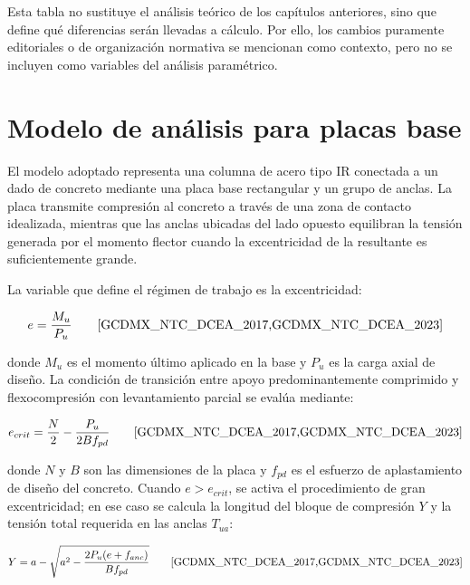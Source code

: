 Esta tabla no sustituye el análisis teórico de los capítulos anteriores, sino que define qué
diferencias serán llevadas a cálculo. Por ello, los cambios puramente editoriales o de
organización normativa se mencionan como contexto, pero no se incluyen como variables del análisis
paramétrico.

\section{Modelo de análisis para placas base}

El modelo adoptado representa una columna de acero tipo IR conectada a un dado de concreto mediante
una placa base rectangular y un grupo de anclas. La placa transmite compresión al concreto a través
de una zona de contacto idealizada, mientras que las anclas ubicadas del lado opuesto equilibran la
tensión generada por el momento flector cuando la excentricidad de la resultante es suficientemente
grande.

La variable que define el régimen de trabajo es la excentricidad:

\begin{equation}
  e = \frac{M_u}{P_u}
  \qquad \text{\cite{GCDMX_NTC_DCEA_2017,GCDMX_NTC_DCEA_2023}}
  \label{eq:met_e}
\end{equation}

\noindent donde $M_u$ es el momento último aplicado en la base y $P_u$ es la carga axial de diseño.
La condición de transición entre apoyo predominantemente comprimido y flexocompresión con
levantamiento parcial se evalúa mediante:

\begin{equation}
  e_{crit} = \frac{N}{2} - \frac{P_u}{2Bf_{pd}}
  \qquad \text{\cite{GCDMX_NTC_DCEA_2017,GCDMX_NTC_DCEA_2023}}
  \label{eq:met_ecrit}
\end{equation}

\noindent donde $N$ y $B$ son las dimensiones de la placa y $f_{pd}$ es el esfuerzo de aplastamiento
de diseño del concreto. Cuando $e>e_{crit}$, se activa el procedimiento de gran excentricidad; en
ese caso se calcula la longitud del bloque de compresión $Y$ y la tensión total requerida en las
anclas $T_{ua}$:

\begin{equation}
  Y = a - \sqrt{a^2 - \frac{2P_u(e+f_{anc})}{Bf_{pd}}}
  \qquad \text{\cite{GCDMX_NTC_DCEA_2017,GCDMX_NTC_DCEA_2023}}
  \label{eq:met_Y}
\end{equation}

